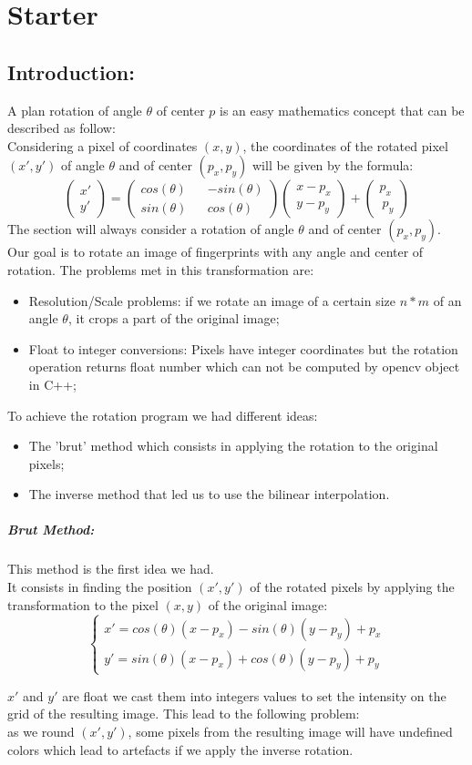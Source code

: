 \documentclass[]{report}
\begin{document}
\section{Starter}
\subsection{Introduction: }
A plan rotation of angle $\theta$ of center $p$ is an easy mathematics concept that can be described as follow:\\
Considering a pixel of coordinates $(x,y)$, the coordinates of the rotated pixel $(x',y')$ of angle $\theta$ and of center $(p_x,p_y)$  will be given by the formula: 
$$  \begin{pmatrix}
x' \\
y'
\end{pmatrix} 
= 
\begin{pmatrix}
cos(\theta) && -sin(\theta) \\
sin(\theta) && cos(\theta)
\end{pmatrix}
\begin{pmatrix}
x - p_x\\
y-p_y
\end{pmatrix} 
+ 
\begin{pmatrix}
p_x \\\ 
p_y
\end{pmatrix}
$$
The section will always consider a rotation of angle $\theta$ and of center $(p_x,p_y)$. \\
Our goal is to rotate an image of fingerprints with any angle and center of rotation.
The problems met in this transformation are:
\begin{itemize}
\item Resolution/Scale problems: if we rotate an image of a certain size $n*m$ of an angle $\theta$, it crops a part of the original image;
\item Float to integer conversions: Pixels have integer coordinates but the rotation operation returns float number which can not be computed by opencv object in C++;
\end{itemize}
To achieve the rotation program we had different ideas:
\begin{itemize}
\item The 'brut' method which consists in applying the rotation to the original pixels; 
\item The inverse method that led us to use the bilinear interpolation.
\end{itemize}
\subparagraph{Brut Method:\\}
This method is the first idea we had.\\
It consists in finding the position $(x',y')$ of the rotated pixels by applying the transformation to the pixel $(x,y)$ of the original image: 
$$
\left\{\begin{array}{ll}
        x'= cos(\theta)(x-p_x) -sin(\theta)(y-p_y) + p_x \\
        y' = sin(\theta)(x-p_x) + cos(\theta)(y-p_y) + p_y
    \end{array}
    \right.
    $$
 
$x'$ and $y'$ are float we cast them into integers values to set the intensity on the grid of the resulting image. This lead to the following problem:\\
as we round $(x',y')$, some pixels from the resulting image will have undefined colors which lead to artefacts if we apply the inverse rotation.
\end{document}

